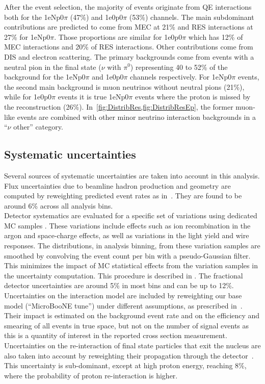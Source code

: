 \documentclass[amsmath,amssymb,aps,prd,showpacs,twocolumn,superscriptaddress,letterpaper,longbibliography, floatfix]{revtex4-2}
\begin{document}
After the event selection, the majority of events originate from QE interactions both for the 1eNp0$\pi$ (47\%) and 1e0p0$\pi$ (53\%) channels. The main subdominant contributions are predicted to come from MEC at 21\% and RES interactions at 27\% for 1eNp0$\pi$. Those proportions are similar for 1e0p0$\pi$ which has 12\% of MEC interactions and 20\% of RES interactions. Other contributions come from DIS and electron scattering. The primary backgrounds come from events with a neutral pion in the final state ($\nu$ with $\pi^0$) representing 40 to 52\% of the background for the 1eNp0$\pi$ and 1e0p0$\pi$ channels respectively. For 1eNp0$\pi$ events, the second main background is muon neutrinos without neutral pions (21\%), while for 1e0p0$\pi$ events it is true 1eNp0$\pi$ events where the proton is missed by the reconstruction (26\%). In~\cref{fig:DistribRes,fig:DistribResEp}, the former muon-like events are combined with other minor neutrino interaction backgrounds in a ``$\nu$ other'' category.

\subsection{Systematic uncertainties}
%
\label{sec:systs}
Several sources of systematic uncertainties are taken into account in this analysis. \\

Flux uncertainties due to beamline hadron production and geometry are computed by reweighting predicted event rates as in~\cite{UbNCDelta,Ubincnumu}. They are found to be around 6\% across all analysis bins.\\ 

Detector systematics are evaluated for a specific set of variations using dedicated MC samples \cite{detsysts}.  These variations include effects such as ion recombination in the argon and space-charge effects, as well as variations in the light yield and wire responses. 
The distributions, in analysis binning, from these variation samples are smoothed by convolving the event count per bin with a pseudo-Gaussian filter. This minimizes the impact of MC statistical effects from the variation samples in the uncertainty computation. This procedure is described in \cite{PELEEnew}. The fractional detector uncertainties are around 5\% in most bins and can be up to 12\%. \\

Uncertainties on the interaction model are included by reweighting our base model (``MicroBooNE tune'') under different assumptions, as prescribed in~\cite{TuneUB}. Their impact is estimated on the background event rate and on the efficiency and smearing of all events in true space, but not on the number of signal events as this is a quantity of interest in the reported cross section measurement. Uncertainties on the re-interaction of final state particles that exit the nucleus are also taken into account by reweighting their propagation through the detector~\cite{ReINT}. This uncertainty is sub-dominant, except at high proton energy, reaching 8\%, where the probability of proton re-interaction is higher.
\\
\end{document}
